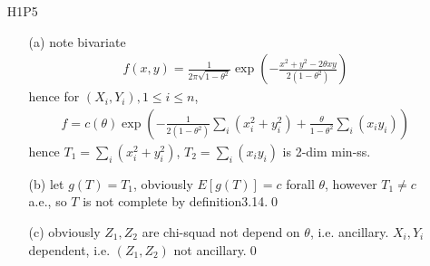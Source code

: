 \documentclass[paper=a4, fontsize=11pt]{scrartcl} %
\numberwithin{equation}{section} %
\numberwithin{figure}{section} %
\numberwithin{table}{section} %
\begin{document}
\begin{itemize}
\begin{itemize}
		\item[(b)]
		\begin{align}
			(X_1-a)/(X_i-a) = Z_1/Z_i \sim F_1/F_i
		\end{align}
		which not depend on parameter since $F,a$ known, i.e. ancillary.
		\item[(c)]
		\begin{align}
			(X_1-X_i)/(X_2-X_i) = (Z_1-Z_i)/(Z_2-Z_i) \sim (F_1-F_i)/(F_2-F_i)
		\end{align}
		which not depend on parameter since $F$ known, i.e. ancillary.\qed
	\end{itemize}
	\item[H1P5]
	\begin{itemize}
		\item[(a)] note bivariate
		\begin{align}
			f(x,y) = \frac{1}{2\pi \sqrt{1-\theta^2}} \exp(-\frac{x^2+y^2-2\theta xy}{2(1-\theta^2)} )
		\end{align}
		hence for $(X_i,Y_i),1\leq i\leq n$,
		\begin{align}
			f = c(\theta) \exp( -\frac{1}{2(1-\theta^2)}\sum_i(x_i^2+y_i^2)+ \frac{\theta}{1-\theta^2}\sum_i(x_iy_i) )
		\end{align}
		hence $T_1 = \sum_i(x_i^2+y_i^2)$, $T_2=\sum_i(x_iy_i)$ is 2-dim min-ss.
		\item[(b)] let $g(T)=T_1$, obviously $E[g(T)]=c$ forall $\theta$, however $T_1\neq c$ a.e., so $T$ is not complete by definition3.14.\qed
		\item[(c)] obviously $Z_1,Z_2$ are chi-squad not depend on $\theta$, i.e. ancillary. $X_i,Y_i$ dependent, i.e. $(Z_1,Z_2)$ not ancillary.\qed
	\end{itemize}
\end{itemize}
\end{document}
